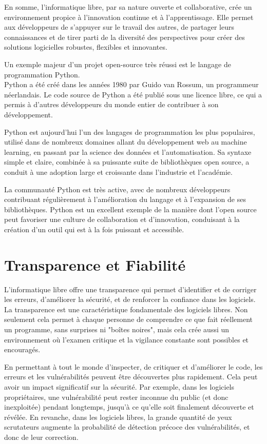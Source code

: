 En somme, l'informatique libre, par sa nature ouverte et collaborative, crée un environnement propice à l'innovation continue et à l'apprentissage. Elle permet aux développeurs de s'appuyer sur le travail des autres, de partager leurs connaissances et de tirer parti de la diversité des perspectives pour créer des solutions logicielles robustes, flexibles et innovantes.

Un exemple majeur d'un projet open-source très réussi est le langage de programmation Python.\\
Python a été créé dans les années 1980 par Guido van Rossum, un programmeur néerlandais. Le code source de Python a été publié sous une licence libre, ce qui a permis à d'autres développeurs du monde entier de contribuer à son développement.

Python est aujourd'hui l'un des langages de programmation les plus populaires, utilisé dans de nombreux domaines allant du développement web au machine learning, en passant par la science des données et l'automatisation. Sa syntaxe simple et claire, combinée à sa puissante suite de bibliothèques open source, a conduit à une adoption large et croissante dans l'industrie et l'académie.

La communauté Python est très active, avec de nombreux développeurs contribuant régulièrement à l'amélioration du langage et à l'expansion de ses bibliothèques. Python est un excellent exemple de la manière dont l'open source peut favoriser une culture de collaboration et d'innovation, conduisant à la création d'un outil qui est à la fois puissant et accessible.

\section{Transparence et Fiabilité}
L'informatique libre offre une transparence qui permet d'identifier et de corriger les erreurs, d'améliorer la sécurité, et de renforcer la confiance dans les logiciels.
La transparence est une caractéristique fondamentale des logiciels libres. Non seulement cela permet à chaque personne de comprendre ce que fait réellement un programme, sans surprises ni "boîtes noires", mais cela crée aussi un environnement où l'examen critique et la vigilance constante sont possibles et encouragés.

En permettant à tout le monde d'inspecter, de critiquer et d'améliorer le code, les erreurs et les vulnérabilités peuvent être découvertes plus rapidement. Cela peut avoir un impact significatif sur la sécurité. Par exemple, dans les logiciels propriétaires, une vulnérabilité peut rester inconnue du public (et donc inexploitée) pendant longtemps, jusqu'à ce qu'elle soit finalement découverte et révélée. En revanche, dans les logiciels libres, la grande quantité de yeux scrutateurs augmente la probabilité de détection précoce des vulnérabilités, et donc de leur correction.

